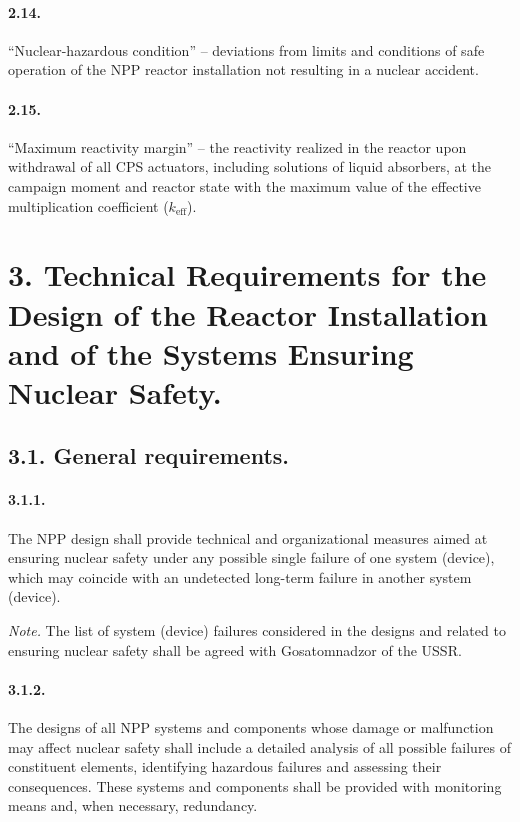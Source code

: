 \documentclass[openright]{bookest}
\begin{document}
\paragraph{2.14.} ``Nuclear-hazardous condition'' -- deviations from limits and conditions of safe operation of the NPP reactor installation not resulting in a nuclear accident.

\paragraph{2.15.} ``Maximum reactivity margin'' -- the reactivity realized in the reactor upon withdrawal of all CPS actuators, including solutions of liquid absorbers, at the campaign moment and reactor state with the maximum value of the effective multiplication coefficient ($k_{\text{eff}}$).

\section*{3. Technical Requirements for the Design of the Reactor Installation and of the Systems Ensuring Nuclear Safety.}

\subsection*{3.1. General requirements.}

\paragraph{3.1.1.} The NPP design shall provide technical and organizational measures aimed at ensuring nuclear safety under any possible single failure of one system (device), which may coincide with an undetected long-term failure in another system (device).

\emph{Note.} The list of system (device) failures considered in the designs and related to ensuring nuclear safety shall be agreed with Gosatomnadzor of the USSR.

\paragraph{3.1.2.} The designs of all NPP systems and components whose damage or malfunction may affect nuclear safety shall include a detailed analysis of all possible failures of constituent elements, identifying hazardous failures and assessing their consequences. These systems and components shall be provided with monitoring means and, when necessary, redundancy.
\end{document}
